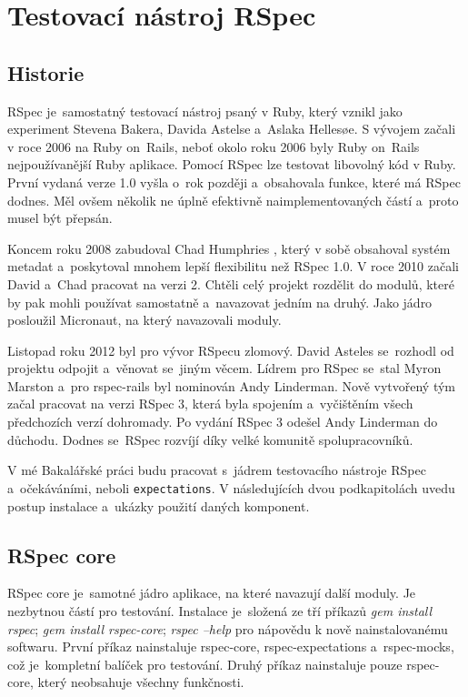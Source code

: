 \section {Testovací nástroj RSpec}
\subsection{Historie}
\par RSpec\cite{davidchelimsky2015} je~samostatný testovací nástroj psaný v Ruby, který vznikl jako experiment Stevena Bakera, Davida Astelse a~Aslaka Hellesøe. S vývojem začali v roce 2006 na Ruby on~Rails, neboť okolo roku 2006 byly Ruby on~Rails nejpoužívanější Ruby aplikace. Pomocí RSpec lze testovat libovolný kód v Ruby. První vydaná verze 1.0 vyšla o~rok později a~obsahovala funkce, které má RSpec dodnes. Měl ovšem několik ne úplně efektivně naimplementovaných částí a~proto musel být přepsán.
\par Koncem roku 2008 zabudoval Chad Humphries , který v sobě obsahoval systém metadat a~poskytoval mnohem lepší flexibilitu než RSpec 1.0. V roce 2010 začali David a~Chad pracovat na verzi 2. Chtěli celý projekt rozdělit do modulů, které by pak mohli používat samostatně a~navazovat jedním na druhý. Jako jádro posloužil Micronaut, na který navazovali moduly.
\par Listopad roku 2012 byl pro vývor RSpecu zlomový. David Asteles se~rozhodl od projektu odpojit a~věnovat se~jiným věcem. Lídrem pro RSpec se~stal Myron Marston a~pro rspec-rails byl nominován Andy Linderman. Nově vytvořený tým začal pracovat na verzi RSpec 3, která byla spojením a~vyčištěním všech předchozích verzí dohromady. Po vydání RSpec 3 odešel Andy Linderman do důchodu. Dodnes se~RSpec rozvíjí díky velké komunitě spolupracovníků.
\par V mé Bakalářské práci budu pracovat s~jádrem testovacího nástroje RSpec a~očekáváními, neboli \texttt{expectations}. V následujících dvou podkapitolách uvedu postup instalace a~ukázky použití daných komponent.

\subsection{RSpec core}
\par RSpec core je~samotné jádro aplikace, na které navazují další moduly. Je nezbytnou částí pro testování. Instalace je~složená ze tří příkazů \textit{gem install rspec}; \textit{gem install rspec-core}; \textit{rspec --help} pro nápovědu k nově nainstalovanému softwaru. První příkaz nainstaluje rspec-core, rspec-expectations a~rspec-mocks, což je~kompletní balíček pro testování. Druhý příkaz nainstaluje pouze rspec-core, který neobsahuje všechny funkčnosti. 

